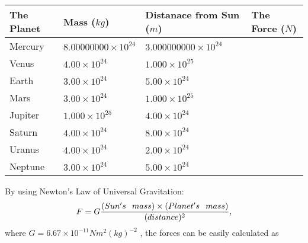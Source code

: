 \documentclass[12pt]{article}
\begin{document}
\vspace{0.2in}
 
 
\begin{tabular}{|l|l|l|l|}
\hline
The Planet & Mass ($kg$) & Distanace from Sun ($m$) & The Force ($N$)\\
\hline
Mercury  &
           $ %
8.00000000 \times 10^{24} $   &
             $ %
3.000000000 \times 10^{24} $    &
\\  \hline
Venus    &
           $ %
4.00 \times 10^{24} $    &
             $ %
1.000 \times 10^{25} $    &
\\  \hline
Earth    &
           $ %
3.00 \times 10^{24} $    &
             $ %
5.00 \times 10^{24} $    &
\\   \hline
Mars     &
           $ %
3.00 \times 10^{24} $    &
             $ %
1.000 \times 10^{25} $    &
\\   \hline
Jupiter  &
           $ %
1.000 \times 10^{25} $    &
             $ %
4.00 \times 10^{24} $    &
\\  \hline
Saturn   &
           $ %
4.00 \times 10^{24}$    &
             $ %
8.00 \times 10^{24}$    &
\\  \hline
Uranus   &
           $ %
4.00 \times 10^{24} $    &
             $ %
2.00 \times 10^{24} $    &
\\  \hline
Neptune  &
           $ %
3.00 \times 10^{24} $    &
             $ %
5.00 \times 10^{24} $    &
\\  \hline
 
\end{tabular}
 
 
 
 
\noindent{}
 
 

By using Newton's Law of Universal Gravitation:
\[
F=G \frac{(Sun's \hspace{0.1in} mass) \times (Planet's \hspace{0.1in} mass)} { (distance)^2},
\]
where
$ G= %
6.67 \times 10^{-11}N m^{2}(kg)^{-2}$ , the forces can be easily calculated as
 
\vspace{0.2in}
 
\end{document}

